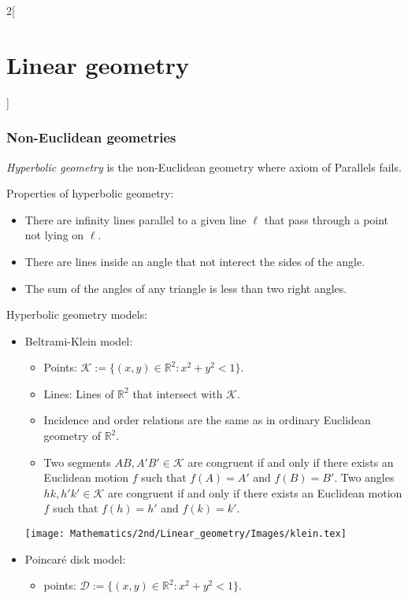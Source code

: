 \documentclass[class=article,10pt,crop=false]{standalone}
\begin{document}
\begin{multicols}{2}[\section{Linear geometry}]
\subsubsection*{Non-Euclidean geometries}
\begin{definition}
\textit{Hyperbolic geometry} is the non-Euclidean geometry where axiom of Parallels fails.
\end{definition}
\begin{prop}
Properties of hyperbolic geometry:
\begin{itemize}
    \item There are infinity lines parallel to a given line $\ell$ that pass through a point not lying on $\ell$.
    \item There are lines inside an angle that not interect the sides of the angle.
    \item The sum of the angles of any triangle is less than two right angles.
\end{itemize}
\end{prop}
\begin{definition}
Hyperbolic geometry models:
\begin{itemize}
    \item Beltrami-Klein model:
    \begin{itemize}
        \item Points: $\mathcal{K}:=\{(x,y)\in\mathbb{R}^2:x^2+y^2<1\}$.
        \item Lines: Lines of $\mathbb{R}^2$ that intersect with $\mathcal{K}$.
        \item Incidence and order relations are the same as in ordinary Euclidean geometry of $\mathbb{R}^2$.
        \item Two segments $AB,A'B'\in\mathcal{K}$ are congruent if and only if there exists an Euclidean motion $f$ such that $f(A)=A'$ and $f(B)=B'$. Two angles $hk,h'k'\in\mathcal{K}$ are congruent if and only if there exists an Euclidean motion $f$ such that $f(h)=h'$ and $f(k)=k'$.
    \end{itemize}
    \begin{minipage}{\linewidth} 
        \centering
        \texttt{[image: Mathematics/2nd/Linear\_geometry/Images/klein.tex]} 
    \end{minipage} 
    \item Poincaré disk model:
    \begin{itemize}
        \item points: $\mathcal{D}:=\{(x,y)\in\mathbb{R}^2:x^2+y^2<1\}$.

\end{itemize}
\end{itemize}
\end{definition}
\end{multicols}
\end{document}
